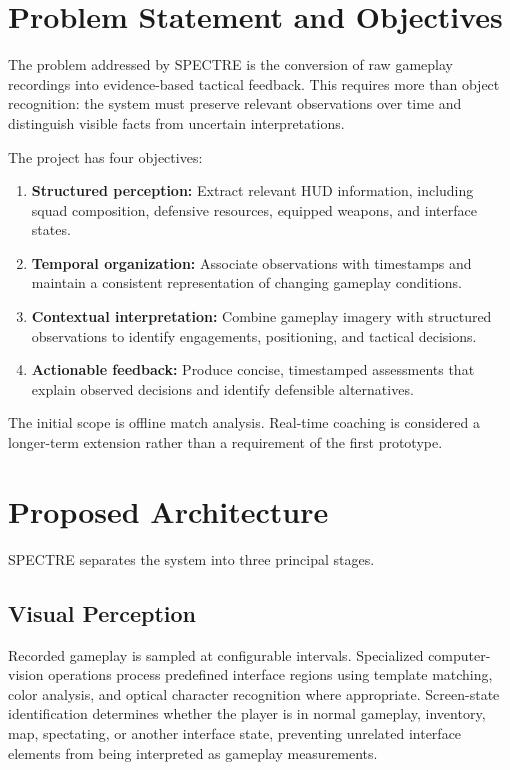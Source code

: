 \documentclass[10pt,letterpaper]{article}
\begin{document}
\section{Problem Statement and Objectives}

The problem addressed by SPECTRE is the conversion of raw gameplay
recordings into evidence-based tactical feedback. This requires more
than object recognition: the system must preserve relevant observations
over time and distinguish visible facts from uncertain interpretations.

The project has four objectives:

\begin{enumerate}
    \item \textbf{Structured perception:} Extract relevant HUD information,
    including squad composition, defensive resources, equipped weapons,
    and interface states.
    \item \textbf{Temporal organization:} Associate observations with
    timestamps and maintain a consistent representation of changing
    gameplay conditions.
    \item \textbf{Contextual interpretation:} Combine gameplay imagery
    with structured observations to identify engagements, positioning,
    and tactical decisions.
    \item \textbf{Actionable feedback:} Produce concise, timestamped
    assessments that explain observed decisions and identify defensible
    alternatives.
\end{enumerate}

The initial scope is offline match analysis. Real-time coaching is
considered a longer-term extension rather than a requirement of the
first prototype.

\section{Proposed Architecture}

SPECTRE separates the system into three principal stages.

\subsection{Visual Perception}

Recorded gameplay is sampled at configurable intervals. Specialized
computer-vision operations process predefined interface regions using
template matching, color analysis, and optical character recognition
where appropriate. Screen-state identification determines whether the
player is in normal gameplay, inventory, map, spectating, or another
interface state, preventing unrelated interface elements from being
interpreted as gameplay measurements.
\end{document}
